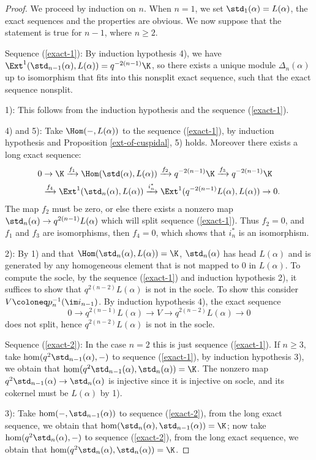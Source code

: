 \begin{proof}
    We proceed by induction on $n$. When $n = 1$, we set $\std_1(\alpha)
     = L(\alpha)$, the exact sequences and the properties are obvious.
    We now suppose that the statement is true for $n-1$, where
    $n\ge 2$.

    Sequence (\ref{exact-1}): By induction hypothesis 4),
    we have $\Ext^1(\std_{n-1}(\alpha),L(\alpha)) = q^{-2(n-1)}\K$,
    so there exists a unique module $\Delta_n(\alpha)$ up to isomorphism
    that fits into this nonsplit exact sequence, such that 
    the exact sequence nonsplit.

    1): This follows from the induction hypothesis and the 
    sequence (\ref{exact-1}).

    4) and 5): Take $\Hom(-,L(\alpha))$ to the sequence (\ref{exact-1}),
    by induction hypothesis and Proposition \ref{ext-of-cuspidal},
    5) holds. Moreover there exists a long exact sequence:
    \[
        \begin{aligned}
            0&\to\K\xrightarrow{f_1}\Hom(\std(\alpha),L(\alpha))\xrightarrow{f_2}
            q^{-2(n-1)}\K\xrightarrow{f_3}q^{-2(n-1)}\K\\
            &\xrightarrow{f_4}
            \Ext^1(\std_n(\alpha),L(\alpha))\xrightarrow{i_n^*}
            \Ext^1(q^{-2(n-1)}L(\alpha),L(\alpha))\to 0.
        \end{aligned}
    \]
    The map $f_2$ must be zero, or else there exists a nonzero map
    $\std_n(\alpha)\to q^{2(n-1)}L(\alpha)$ which will split
    sequence (\ref{exact-1}). Thus $f_2 = 0$, and  $f_1$ and $f_3$ are isomorphisms,
    then $f_4 = 0$, which shows that $i_n^*$ is an isomorphism.

    2): By 1) and that $\Hom(\std_n(\alpha),L(\alpha)) = \K$,
    $\std_n(\alpha)$ has head $L(\alpha)$ and is generated by 
    any homogeneous element that is not mapped to $0$ in $L(\alpha)$.
    To compute the socle, by the sequence (\ref{exact-1})
    and induction hypothesis 2), it suffices to show that
    $q^{2(n-2)}L(\alpha)$ is not in the socle. To show this
    consider $V \coloneq  p_n^{-1}(\im i_{n-1})$. By induction hypothesis 4),
    the exact sequence $$0\to q^{2(n-1)}L(\alpha)\to V
    \to q^{2(n-2)}L(\alpha)\to 0$$ does not split,
    hence $q^{2(n-2)}L(\alpha)$ is not in the socle.

    Sequence (\ref{exact-2}): In the case $n = 2$ this is just
    sequence (\ref{exact-1}). If $n\ge 3$, take $\hom(q^2\std_{n-1}(\alpha),-)$
    to sequence (\ref{exact-1}), by induction hypothesis 3),
    we obtain that $\hom(q^2\std_{n-1}(\alpha),\std_n(\alpha)) = \K$.
    The nonzero map $q^2\std_{n-1}(\alpha)\to\std_n(\alpha)$ is injective
    since it is injective on socle, and its cokernel must be
    $L(\alpha)$ by 1).

    3): Take $\hom(-,\std_{n-1}(\alpha))$ to sequence (\ref{exact-2}),
    from the long exact sequence, we obtain that $\hom(\std_n(\alpha),\std_{n-1}(\alpha)) = \K$;
    now take $\hom(q^2\std_n(\alpha),-)$ to sequence (\ref{exact-2}),
    from the long exact sequence, we obtain that $\hom(q^2\std_n(\alpha),\std_n(\alpha)) = \K$.
\end{proof}

